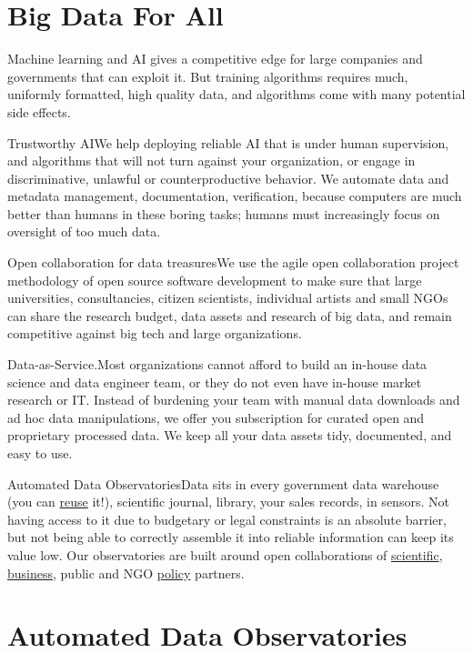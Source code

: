 \documentclass[
  a4paper,
  openany, a4paper, oneside]{book}
\begin{document}
\hypertarget{big-data-for-all-1}{%
\section*{Big Data For All}\label{big-data-for-all-1}}

Machine learning and AI gives a competitive edge for large companies and governments that can exploit it. But training algorithms requires much, uniformly formatted, high quality data, and algorithms come with many potential side effects.

Trustworthy AIWe help deploying reliable AI that is under human supervision, and algorithms that will not turn against your organization, or engage in discriminative, unlawful or counterproductive behavior. We automate data and metadata management, documentation, verification, because computers are much better than humans in these boring tasks; humans must increasingly focus on oversight of too much data.

Open collaboration for data treasuresWe use the agile open collaboration project methodology of open source software development to make sure that large universities, consultancies, citizen scientists, individual artists and small NGOs can share the research budget, data assets and research of big data, and remain competitive against big tech and large organizations.

Data-as-Service.Most organizations cannot afford to build an in-house data science and data engineer team, or they do not even have in-house market research or IT. Instead of burdening your team with manual data downloads and ad hoc data manipulations, we offer you subscription for curated open and proprietary processed data. We keep all your data assets tidy, documented, and easy to use.

Automated Data ObservatoriesData sits in every government data warehouse (you can \protect\hyperlink{open-data}{reuse} it!), scientific journal, library, your sales records, in sensors. Not having access to it due to budgetary or legal constraints is an absolute barrier, but not being able to correctly assemble it into reliable information can keep its value low. Our observatories are built around open collaborations of \protect\hyperlink{intro-academic-partners}{scientific}, \protect\hyperlink{intro-business-partners}{business}, public and NGO \protect\hyperlink{intro-policy-partners}{policy} partners.

\hypertarget{data-observatory}{%
\section*{Automated Data Observatories}\label{data-observatory}}
\end{document}
